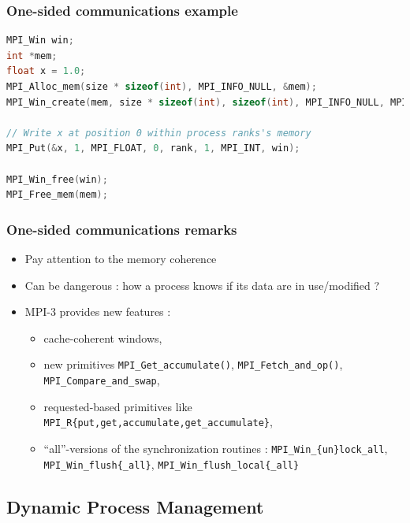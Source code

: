 \begin{frame}[containsverbatim]
\frametitle{One-sided communications example}

\begin{lstlisting}[language=C,frame=lines]
MPI_Win win;
int *mem;
float x = 1.0;
MPI_Alloc_mem(size * sizeof(int), MPI_INFO_NULL, &mem);
MPI_Win_create(mem, size * sizeof(int), sizeof(int), MPI_INFO_NULL, MPI_COMM_WORLD, &win);

// Write x at position 0 within process ranks's memory
MPI_Put(&x, 1, MPI_FLOAT, 0, rank, 1, MPI_INT, win);

MPI_Win_free(win);
MPI_Free_mem(mem);
\end{lstlisting}


\end{frame}


\begin{frame}[containsverbatim]
\frametitle{One-sided communications remarks}

\begin{itemize}
	\item {Pay attention to the memory coherence}
	\item {Can be dangerous : how a process knows if its data are in use/modified ?}
	\item {MPI-3 provides new features : \begin{itemize}
			\item cache-coherent windows,
			\item new primitives \verb+MPI_Get_accumulate()+, \verb+MPI_Fetch_and_op()+, \verb+MPI_Compare_and_swap+,
			\item requested-based primitives like \verb+MPI_R{put,get,accumulate,get_accumulate}+,
			\item ``all''-versions of the synchronization routines : \verb+MPI_Win_{un}lock_all+, \verb+MPI_Win_flush{_all}+, \verb+MPI_Win_flush_local{_all}+
			\end{itemize}
	}
\end{itemize}
\end{frame}



\subsection{Dynamic Process Management}


